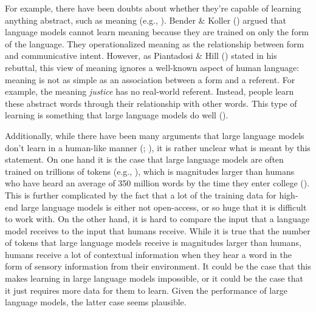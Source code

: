 \documentclass[
  12pt,
  letterpaper,
]{scrreprt}
\begin{document}
For example, there have been doubts about whether they're capable of
learning anything abstract, such as meaning (e.g.,
).
Bender \& Koller ()
argued that language models cannot learn meaning because they are
trained on only the form of the language. They operationalized meaning
as the relationship between form and communicative intent. However, as
Piantadosi \& Hill
() stated in his
rebuttal, this view of meaning ignores a well-known aspect of human
language: meaning is not as simple as an association between a form and
a referent. For example, the meaning \emph{justice} has no real-world
referent. Instead, people learn these abstract words through their
relationship with other words. This type of learning is something that
large language models do well
().

Additionally, while there have been many arguments that large language
models don't learn in a human-like manner
(;
), it
is rather unclear what is meant by this statement. On one hand it is the
case that large language models are often trained on trillions of tokens
(e.g., ), which is magnitudes larger than humans who have heard an
average of 350 million words by the time they enter college
(). This is further complicated by the fact that a lot of the
training data for high-end large language models is either not
open-access, or so huge that it is difficult to work with. On the other
hand, it is hard to compare the input that a language model receives to
the input that humans receive. While it is true that the number of
tokens that large language models receive is magnitudes larger than
humans, humans receive a lot of contextual information when they hear a
word in the form of sensory information from their environment. It could
be the case that this makes learning in large language models
impossible, or it could be the case that it just requires more data for
them to learn. Given the performance of large language models, the
latter case seems plausible.
\end{document}
